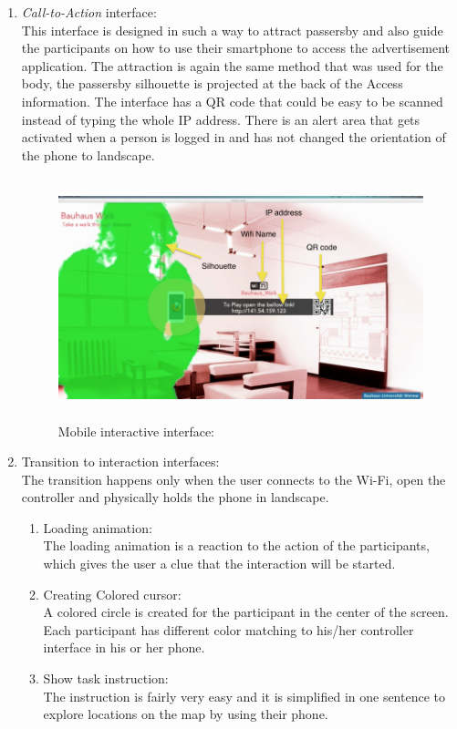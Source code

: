 \begin{enumerate}

\item \emph{Call-to-Action} interface: \\
This interface is designed in such a way to attract passersby and also guide the participants on how to use their smartphone to access the advertisement application. The attraction is again the same method that was used for the body, the passersby silhouette is projected at the back of the Access information. The interface has a QR code that could be easy to be scanned instead of typing the whole IP address. There is an alert area that gets activated when a person is logged in and has not changed the orientation of the phone to landscape.

\begin{figure}[H]
    \centering
    \includegraphics[width=120mm,height=70mm]{Figures/6/mobile/call-to-action}
    \caption{Mobile interactive interface:}%
    \label{fig:mobile_firstinterface}%
\end{figure}



\item Transition to interaction interfaces: \\
The transition happens only when the user connects to the Wi-Fi, open the controller and physically holds the phone in landscape.

\begin{enumerate}
\item Loading animation:\\
The loading animation is a reaction to the action of the participants, which gives the user a clue that the interaction will be started. 
\item  Creating Colored cursor: \\
A colored circle is created for the participant in the center of the screen. Each participant has different color matching to his/her controller interface in his or her phone.
\item Show task instruction:  \\
The instruction is fairly very easy and it is simplified in one sentence to explore locations on the map by using their phone.



\end{enumerate}
\end{enumerate}
